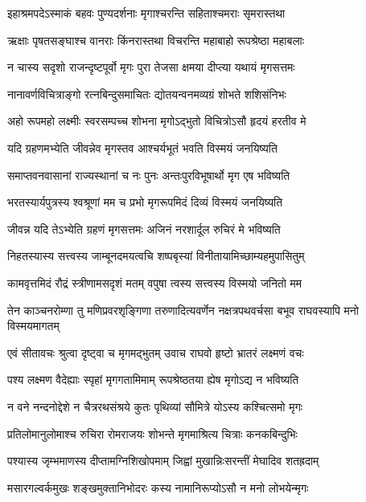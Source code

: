 \twolineshloka
{इहाश्रमपदेऽस्माकं बहवः पुण्यदर्शनाः}
{मृगाश्चरन्ति सहिताश्चमराः सृमरास्तथा} %

\twolineshloka
{ऋक्षाः पृषतसङ्घाश्च वानराः किंनरास्तथा}
{विचरन्ति महाबाहो रूपश्रेष्ठा महाबलाः} %

\twolineshloka
{न चास्य सदृशो राजन्दृष्टपूर्वो मृगः पुरा}
{तेजसा क्षमया दीप्त्या यथायं मृगसत्तमः} %

\twolineshloka
{नानावर्णविचित्राङ्गो रत्नबिन्दुसमाचितः}
{द्योतयन्वनमव्यग्रं शोभते शशिसंनिभः} %

\twolineshloka
{अहो रूपमहो लक्ष्मीः स्वरसम्पच्च शोभना}
{मृगोऽद्भुतो विचित्रोऽसौ हृदयं हरतीव मे} %

\twolineshloka
{यदि ग्रहणमभ्येति जीवन्नेव मृगस्तव}
{आश्चर्यभूतं भवति विस्मयं जनयिष्यति} %

\twolineshloka
{समाप्तवनवासानां राज्यस्थानां च नः पुनः}
{अन्तःपुरविभूषार्थो मृग एष भविष्यति} %

\twolineshloka
{भरतस्यार्यपुत्रस्य श्वश्रूणां मम च प्रभो}
{मृगरूपमिदं दिव्यं विस्मयं जनयिष्यति} %

\twolineshloka
{जीवन्न यदि तेऽभ्येति ग्रहणं मृगसत्तमः}
{अजिनं नरशार्दूल रुचिरं मे भविष्यति} %

\twolineshloka
{निहतस्यास्य सत्त्वस्य जाम्बूनदमयत्वचि}
{शष्पबृस्यां विनीतायामिच्छाम्यहमुपासितुम्} %

\twolineshloka
{कामवृत्तमिदं रौद्रं स्त्रीणामसदृशं मतम्}
{वपुषा त्वस्य सत्त्वस्य विस्मयो जनितो मम} %

\threelineshloka
{तेन काञ्चनरोम्णा तु मणिप्रवरशृङ्गिणा}
{तरुणादित्यवर्णेन नक्षत्रपथवर्चसा}
{बभूव राघवस्यापि मनो विस्मयमागतम्} %

\twolineshloka
{एवं सीतावचः श्रुत्वा दृष्ट्वा च मृगमद्भुतम्}
{उवाच राघवो हृष्टो भ्रातरं लक्ष्मणं वचः} %

\twolineshloka
{पश्य लक्ष्मण वैदेह्याः स्पृहां मृगगतामिमाम्}
{रूपश्रेष्ठतया ह्येष मृगोऽद्य न भविष्यति} %

\twolineshloka
{न वने नन्दनोद्देशे न चैत्ररथसंश्रये}
{कुतः पृथिव्यां सौमित्रे योऽस्य कश्चित्समो मृगः} %

\twolineshloka
{प्रतिलोमानुलोमाश्च रुचिरा रोमराजयः}
{शोभन्ते मृगमाश्रित्य चित्राः कनकबिन्दुभिः} %

\twolineshloka
{पश्यास्य जृम्भमाणस्य दीप्तामग्निशिखोपमाम्}
{जिह्वां मुखान्निःसरन्तीं मेघादिव शतह्रदाम्} %

\twolineshloka
{मसारगल्वर्कमुखः शङ्खमुक्तानिभोदरः}
{कस्य नामानिरूप्योऽसौ न मनो लोभयेन्मृगः} %

